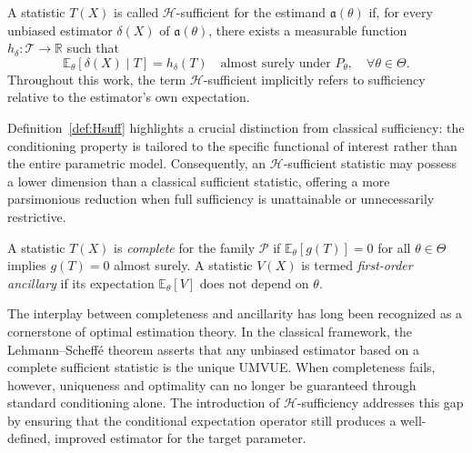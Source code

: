 \documentclass[twoside]{article}
\begin{document}
\begin{dfn}\label{def:Hsuff}
A statistic $T(X)$ is called $\mathscr{H}$-sufficient for the estimand $\mathfrak{a}(\theta)$ if, for every unbiased estimator $\delta(X)$ of $\mathfrak{a}(\theta)$, there exists a measurable function $h_{\delta} : \mathcal{T} \to \mathbb{R}$ such that
\begin{equation}
    \mathbb{E}_{\theta}[\delta(X) \mid T] = h_{\delta}(T) \quad \text{almost surely under } P_{\theta}, \quad \forall \theta \in \Theta.
\end{equation}
Throughout this work, the term $\mathscr{H}$-sufficient implicitly refers to sufficiency relative to the estimator's own expectation.
\end{dfn}

Definition~\ref{def:Hsuff} highlights a crucial distinction from classical sufficiency: the conditioning property is tailored to the specific functional of interest rather than the entire parametric model. Consequently, an $\mathscr{H}$-sufficient statistic may possess a lower dimension than a classical sufficient statistic, offering a more parsimonious reduction when full sufficiency is unattainable or unnecessarily restrictive.

\begin{dfn}\label{def:comp_anc}
A statistic $T(X)$ is \textit{complete} for the family $\mathcal{P}$ if $\mathbb{E}_{\theta}[g(T)] = 0$ for all $\theta \in \Theta$ implies $g(T) = 0$ almost surely. A statistic $V(X)$ is termed \textit{first-order ancillary} if its expectation $\mathbb{E}_{\theta}[V]$ does not depend on $\theta$.
\end{dfn}

The interplay between completeness and ancillarity has long been recognized as a cornerstone of optimal estimation theory. In the classical framework, the Lehmann--Scheffé theorem asserts that any unbiased estimator based on a complete sufficient statistic is the unique UMVUE. When completeness fails, however, uniqueness and optimality can no longer be guaranteed through standard conditioning alone. The introduction of $\mathscr{H}$-sufficiency addresses this gap by ensuring that the conditional expectation operator still produces a well-defined, improved estimator for the target parameter.
\end{document}
